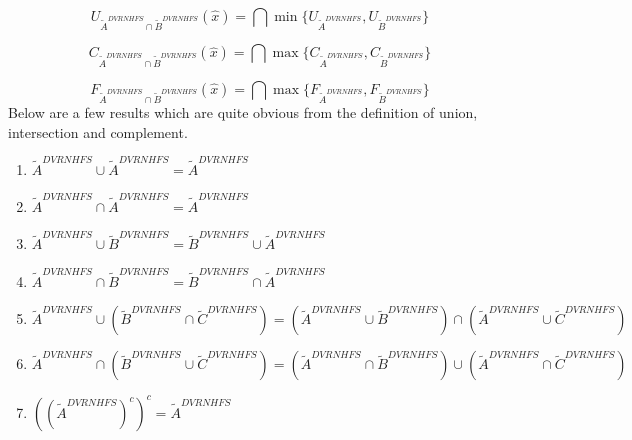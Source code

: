 \documentclass[a4paper]{elsarticle}
\begin{document}
{\begin{equation}
\label{ei2int}
U_{\tilde{A}^{DVRNHFS}\cap \tilde{B}^{DVRNHFS}}(\hat{x}) = \bigcap \min\{U_{\tilde{A}^{DVRNHFS}},U_{\tilde{B}^{DVRNHFS}}\}
\end{equation}

\begin{equation}
\label{ei3int}
C_{\tilde{A}^{DVRNHFS}\cap \tilde{B}^{DVRNHFS}}(\hat{x}) = \bigcap \max\{C_{\tilde{A}^{DVRNHFS}},C_{\tilde{B}^{DVRNHFS}}\}
\end{equation}

\begin{equation}
\label{ei4int}
F_{\tilde{A}^{DVRNHFS}\cap \tilde{B}^{DVRNHFS}}(\hat{x}) = \bigcap \max\{F_{\tilde{A}^{DVRNHFS}},F_{\tilde{B}^{DVRNHFS}}\}
\end{equation}
Below are a few results which are quite obvious from the definition of union, intersection and complement.
\begin{enumerate}
  \item $\tilde{A}^{DVRNHFS}\cup\tilde{A}^{DVRNHFS}=\tilde{A}^{DVRNHFS}$
  \item $\tilde{A}^{DVRNHFS}\cap\tilde{A}^{DVRNHFS}=\tilde{A}^{DVRNHFS}$
  \item $\tilde{A}^{DVRNHFS}\cup\tilde{B}^{DVRNHFS}=\tilde{B}^{DVRNHFS}\cup\tilde{A}^{DVRNHFS}$
  \item $\tilde{A}^{DVRNHFS}\cap\tilde{B}^{DVRNHFS}=\tilde{B}^{DVRNHFS}\cap\tilde{A}^{DVRNHFS}$
\item $\tilde{A}^{DVRNHFS}\cup(\tilde{B}^{DVRNHFS}\cap\tilde{C}^{DVRNHFS})=(\tilde{A}^{DVRNHFS}\cup\tilde{B}^{DVRNHFS})\cap (\tilde{A}^{DVRNHFS}\cup \tilde{C}^{DVRNHFS})$
  \item $\tilde{A}^{DVRNHFS}\cap(\tilde{B}^{DVRNHFS}\cup\tilde{C}^{DVRNHFS})=(\tilde{A}^{DVRNHFS}\cap\tilde{B}^{DVRNHFS})\cup (\tilde{A}^{DVRNHFS}\cap \tilde{C}^{DVRNHFS})$
  \item $((\tilde{A}^{DVRNHFS})^{c})^{c}=\tilde{A}^{DVRNHFS}$
\end{enumerate}
}
\end{document}
